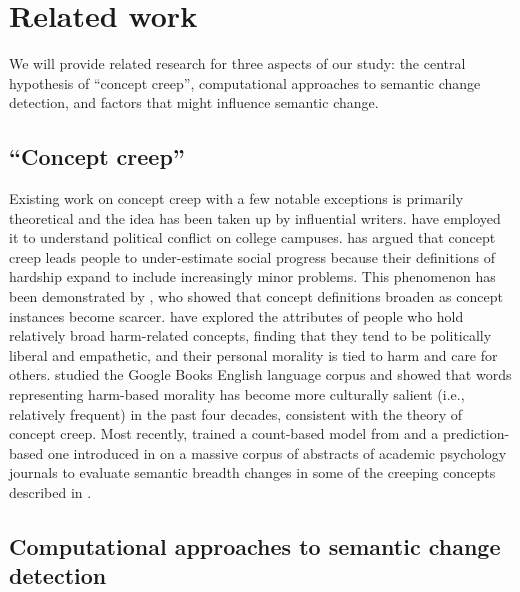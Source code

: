 \documentclass[output=paper]{langsci/langscibook}
\begin{document}
\section{Related work}
We will provide related research for three aspects of our study: the central hypothesis of ``concept creep'', computational approaches to semantic change detection, and factors that might influence semantic change.

\subsection{``Concept creep''}

Existing work on concept creep with a few notable exceptions is primarily theoretical and the idea has been taken up by influential writers. \citet{lukianoff2019coddling} have employed it to understand political conflict on college campuses. \citet{pinker2018enlightenment} has argued that concept creep leads people to under-estimate social progress because their definitions of hardship expand to include increasingly minor problems. This phenomenon has been demonstrated by \citet{levari2018prevalence}, who showed that concept definitions broaden as concept instances become scarcer. \citet{mcgrath2019concept} have explored the attributes of people who hold relatively broad harm-related concepts, finding that they tend to be politically liberal and empathetic, and their personal morality is tied to harm and care for others. \citet{wheeler2019twentieth} studied the Google Books English language corpus and showed that words representing harm-based morality has become more culturally salient (i.e., relatively frequent) in the past four decades, consistent with the theory of concept creep. Most recently, \citet{vylomova-etal-2019-evaluation} trained a count-based model from \citet{sagi-etal-2009-semantic} and a prediction-based one introduced in \citet{hamilton-etal-2016-diachronic} on a massive corpus of abstracts of academic psychology journals to evaluate semantic breadth changes in some of the creeping concepts described in \citet{haslam2016concept}.

\subsection{Computational approaches to semantic change detection}
\end{document}

